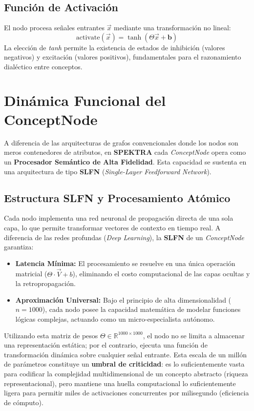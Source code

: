 \documentclass[12pt]{article}
\begin{document}
\subsection{Función de Activación}
El nodo procesa señales entrantes $\vec{x}$ mediante una transformación no lineal:
\begin{equation}
    \text{activate}(\vec{x}) = \tanh(\Theta \vec{x} + \bm{b})
\end{equation}
La elección de \textit{tanh} permite la existencia de estados de inhibición (valores negativos) y excitación (valores positivos), fundamentales para el razonamiento dialéctico entre conceptos.




\section{Dinámica Funcional del ConceptNode}

A diferencia de las arquitecturas de grafos convencionales donde los nodos son meros contenedores de atributos, en \textbf{SPEKTRA} cada \textit{ConceptNode} opera como un \textbf{Procesador Semántico de Alta Fidelidad}. Esta capacidad se sustenta en una arquitectura de tipo \textbf{SLFN} (\textit{Single-Layer Feedforward Network}).

\subsection{Estructura SLFN y Procesamiento Atómico}
Cada nodo implementa una red neuronal de propagación directa de una sola capa, lo que permite transformar vectores de contexto en tiempo real. A diferencia de las redes profundas (\textit{Deep Learning}), la \textbf{SLFN} de un \textit{ConceptNode} garantiza:
\begin{itemize}
	\item \textbf{Latencia Mínima:} El procesamiento se resuelve en una única operación matricial ($\Theta \cdot \vec{V} + b$), eliminando el costo computacional de las capas ocultas y la retropropagación.
	\item \textbf{Aproximación Universal:} Bajo el principio de alta dimensionalidad ($n=1000$), cada nodo posee la capacidad matemática de modelar funciones lógicas complejas, actuando como un micro-especialista autónomo.
\end{itemize}



Utilizando esta matriz de pesos $\Theta \in \mathbb{R}^{1000 \times 1000}$, el nodo no se limita a almacenar una representación estática; por el contrario, ejecuta una función de transformación dinámica sobre cualquier señal entrante. Esta escala de un millón de parámetros constituye un \textbf{umbral de criticidad}: es lo suficientemente vasta para codificar la complejidad multidimensional de un concepto abstracto (riqueza representacional), pero mantiene una huella computacional lo suficientemente ligera para permitir miles de activaciones concurrentes por milisegundo (eficiencia de cómputo).
\end{document}
